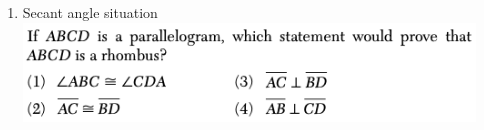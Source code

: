 \documentclass[12pt, oneside]{article}
\begin{document}
\begin{enumerate}
\item Secant angle situation\\
\includegraphics[width=12cm]{R-4images/R-4RhombusB.png}
\vspace{1cm}

\end{enumerate}
\end{document}
